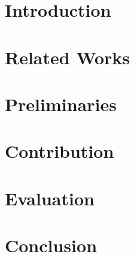 \documentclass{llncs2e/llncs}
\begin{document}
\def\todo#1{{\color{red}TODO:\quad#1}}
\def\addref#1{{\color{red}$[$#1$]$}}
\def\undef{\textit{undef}}

\section{Introduction}


\section{Related Works}


\section{Preliminaries}


\section{Contribution}


\section{Evaluation}


\section{Conclusion}


%
%
\newpage
\nocite{*}


\end{document}
